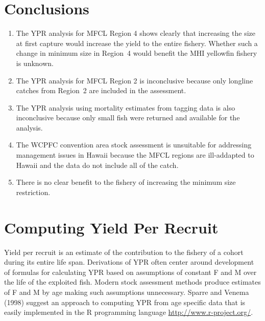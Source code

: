 \documentclass[12pt,letterpaper]{article}
\begin{document}
\section*{Conclusions}
\begin{enumerate}
\item The YPR analysis for MFCL Region 4 shows clearly that increasing
the size at first capture would increase the yield to the entire fishery.
Whether such a change in minimum size in Region~4 would
benefit the MHI yellowfin fishery is unknown.

\item The YPR analysis for MFCL Region 2 is inconclusive because only
longline catches from Region~2 are included in the assessment.

\item The YPR analysis using mortality estimates from tagging data is
also inconclusive because only small fish were returned and
available for the analysis. 

\item The WCPFC convention area stock assessment is unsuitable for
addressing management issues in Hawaii because the
MFCL regions are ill-addapted to Hawaii and the data do not include
all of the catch.

\item There is no clear benefit to the fishery of increasing the
minimum size restriction.
\end{enumerate}


\section*{Computing Yield Per Recruit}


Yield per recruit is an estimate of the contribution to the fishery of
a cohort during its entire life span.
Derivations of YPR often center around development of formulas for
calculating YPR based on assumptions of constant F and M over the life
of the exploited fish. Modern stock assessment methods produce
estimates of F and M by age making such assumptions unnecessary.
Sparre and Venema (1998) suggest an approach to computing YPR from age
specific data that is easily implemented in the R programming language
\url{http://www.r-project.org/}.
\end{document}
